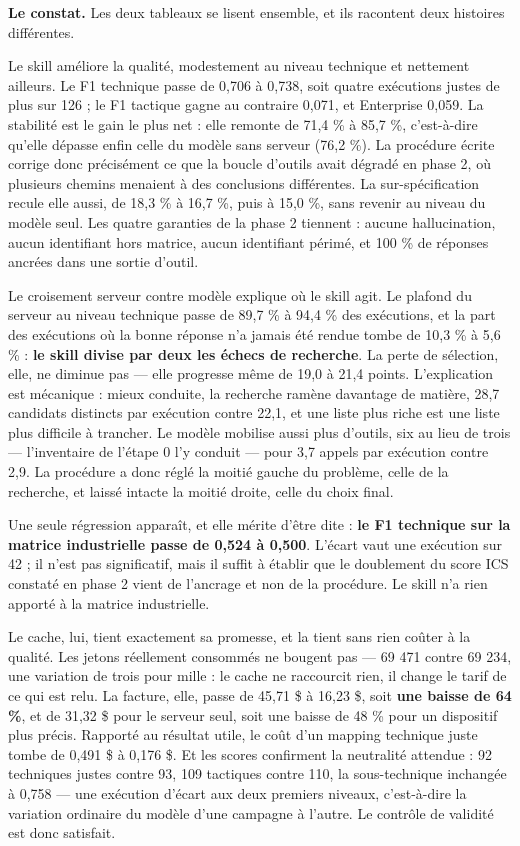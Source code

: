 \textbf{Le constat.} Les deux tableaux se lisent ensemble, et ils racontent deux histoires différentes.

Le skill améliore la qualité, modestement au niveau technique et nettement ailleurs. Le F1 technique passe de 0,706 à 0,738, soit quatre exécutions justes de plus sur 126 ; le F1 tactique gagne au contraire 0,071, et Enterprise 0,059. La stabilité est le gain le plus net : elle remonte de 71,4 \% à 85,7 \%, c'est-à-dire qu'elle dépasse enfin celle du modèle sans serveur (76,2 \%). La procédure écrite corrige donc précisément ce que la boucle d'outils avait dégradé en phase 2, où plusieurs chemins menaient à des conclusions différentes. La sur-spécification recule elle aussi, de 18,3 \% à 16,7 \%, puis à 15,0 \%, sans revenir au niveau du modèle seul. Les quatre garanties de la phase 2 tiennent : aucune hallucination, aucun identifiant hors matrice, aucun identifiant périmé, et 100 \% de réponses ancrées dans une sortie d'outil.

Le croisement serveur contre modèle explique où le skill agit. Le plafond du serveur au niveau technique passe de 89,7 \% à 94,4 \% des exécutions, et la part des exécutions où la bonne réponse n'a jamais été rendue tombe de 10,3 \% à 5,6 \% : \textbf{le skill divise par deux les échecs de recherche}. La perte de sélection, elle, ne diminue pas --- elle progresse même de 19,0 à 21,4 points. L'explication est mécanique : mieux conduite, la recherche ramène davantage de matière, 28,7 candidats distincts par exécution contre 22,1, et une liste plus riche est une liste plus difficile à trancher. Le modèle mobilise aussi plus d'outils, six au lieu de trois --- l'inventaire de l'étape 0 l'y conduit --- pour 3,7 appels par exécution contre 2,9. La procédure a donc réglé la moitié gauche du problème, celle de la recherche, et laissé intacte la moitié droite, celle du choix final.

Une seule régression apparaît, et elle mérite d'être dite : \textbf{le F1 technique sur la matrice industrielle passe de 0,524 à 0,500}. L'écart vaut une exécution sur 42 ; il n'est pas significatif, mais il suffit à établir que le doublement du score ICS constaté en phase 2 vient de l'ancrage et non de la procédure. Le skill n'a rien apporté à la matrice industrielle.

Le cache, lui, tient exactement sa promesse, et la tient sans rien coûter à la qualité. Les jetons réellement consommés ne bougent pas --- 69 471 contre 69 234, une variation de trois pour mille : le cache ne raccourcit rien, il change le tarif de ce qui est relu. La facture, elle, passe de 45,71 \$ à 16,23 \$, soit \textbf{une baisse de 64 \%}, et de 31,32 \$ pour le serveur seul, soit une baisse de 48 \% pour un dispositif plus précis. Rapporté au résultat utile, le coût d'un mapping technique juste tombe de 0,491 \$ à 0,176 \$. Et les scores confirment la neutralité attendue : 92 techniques justes contre 93, 109 tactiques contre 110, la sous-technique inchangée à 0,758 --- une exécution d'écart aux deux premiers niveaux, c'est-à-dire la variation ordinaire du modèle d'une campagne à l'autre. Le contrôle de validité est donc satisfait.

